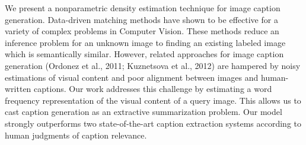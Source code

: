 We present a nonparametric density estimation technique for image caption generation. Data-driven matching methods have shown to be effective for a variety of complex problems in Computer Vision. These methods reduce an inference problem for an unknown image to finding an existing labeled image which is semantically similar. However, related approaches for image caption generation (Ordonez et al., 2011; Kuznetsova et al., 2012) are hampered by noisy estimations of visual content and poor alignment between images and human-written captions. Our work addresses this challenge by estimating a word frequency representation of the visual content of a query image. This allows us to cast caption generation as an extractive summarization problem. Our model strongly outperforms two state-of-the-art caption extraction systems according to human judgments of caption relevance.
